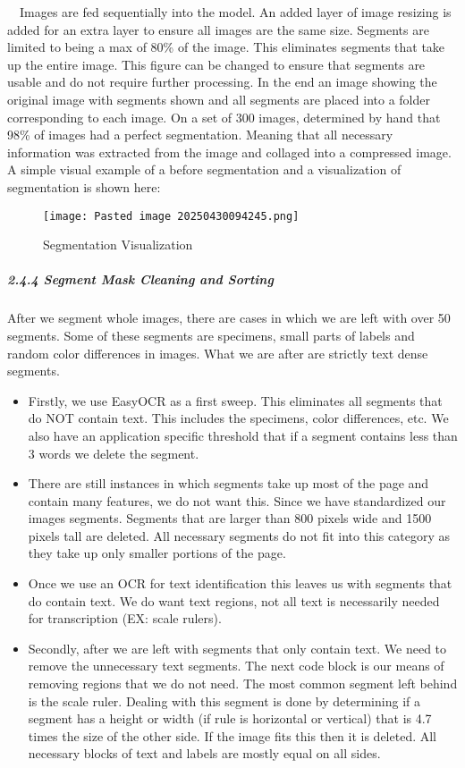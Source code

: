 \documentclass{article}
\begin{document}
$\quad$Images are fed sequentially into the model. An added layer of image resizing is added for an extra layer to ensure all images are the same size. Segments are limited to being a max of 80\% of the image. This eliminates segments that take up the entire image. This figure can be changed to ensure that segments are usable and do not require further processing. In the end an image showing the original image with segments shown and all segments are placed into a folder corresponding to each image. On a set of 300 images, determined by hand that 98\% of images had a perfect segmentation. Meaning that all necessary information was extracted from the image and collaged into a compressed image. A simple visual example of a before segmentation and a visualization of segmentation is shown here:

\begin{figure}[h!]
    \centering
    \texttt{[image: Pasted image 20250430094245.png]}
    \caption{Segmentation Visualization}
    \label{fig:enter-label}
\end{figure}




\subparagraph*{2.4.4 Segment Mask Cleaning and Sorting}
After we segment whole images, there are cases in which we are left with over 50 segments. Some of these segments are specimens, small parts of labels and random color differences in images. What we are after are strictly text dense segments. 
\begin{itemize}
\item Firstly, we use EasyOCR as a first sweep. This eliminates all segments that do NOT contain text. This includes the specimens, color differences, etc. We also have an application specific threshold that if a segment contains less than 3 words we delete the segment.
\item There are still instances in which segments take up most of the page and contain many features, we do not want this. Since we have standardized our images segments. Segments that are larger than 800 pixels wide and 1500 pixels tall are deleted. All necessary segments do not fit into this category as they take up only smaller portions of the page.
\item Once we use an OCR for text identification this leaves us with segments that do contain text. We do want text regions, not all text is necessarily needed for transcription (EX: scale rulers). 
\item Secondly, after we are left with segments that only contain text. We need to remove the unnecessary text segments. The next code block is our means of removing regions that we do not need. The most common segment left behind is the scale ruler. Dealing with this segment is done by determining if a segment has a height or width (if rule is horizontal or vertical) that is 4.7 times the size of the other side. If the image fits this then it is deleted. All necessary blocks of text and labels are mostly equal on all sides.
\end{itemize}
\end{document}
